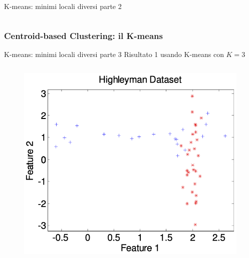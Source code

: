 \begin{frame}
\begin{block}{K-means: minimi locali diversi parte 2}
\begin{columns}
		\end{columns}
	\end{block}

\end{frame}



\begin{frame}

	\frametitle{{\color{GradientDescentDiagramBlue}Centroid-based Clustering}: il K-means}

	\begin{block}{K-means: minimi locali diversi parte 3}
		Risultato 1 usando K-means con $K=3$
		\begin{columns}
			\begin{figure}[!htbp]
				\centering
				\includegraphics[angle=0,width=1\linewidth]{images/unsupervised/kmeans/highley_gt.png}
			\end{figure}


\end{columns}
\end{block}
\end{frame}
